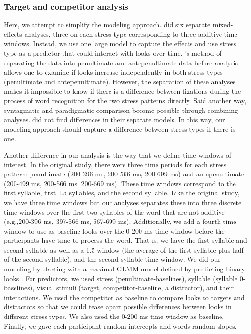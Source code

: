 \subsubsection{Target and competitor analysis}
Here, we attempt to simplify the modeling approach. \cite{Sulpizio_McQueen_2012} did six separate mixed-effects analyses, three on each stress type corresponding to three additive time windows. Instead, we use one large model to capture the effects and use stress type as a predictor that could interact with looks over time. \cite{Sulpizio_McQueen_2012}'s method of separating the data into penultimate and antepenultimate data before analysis allows one to examine if looks increase independently in both stress types (penultimate and antepenultimate). However, the separation of these analyses makes it impossible to know if there is a difference between fixations during the process of word recognition for the two stress patterns directly. Said another way, syntagmatic and paradigmatic comparison become possible through combining analyses. \cite{Sulpizio_McQueen_2012} did not find differences in their separate models. In this way, our modeling approach should capture a difference between stress types if there is one. 

Another difference in our analysis is the way that we define time windows of interest. In the original study, there were three time periods for each stress pattern: penultimate (200-396 ms, 200-566 ms, 200-699 ms) and antepenultimate (200-499 ms, 200-566 ms, 200-669 ms). These time windows correspond to the first syllable, first 1.5 syllables, and the second syllable. Like the original study, we have three time windows but our analyses separates these into three discrete time windows over the first two syllables of the word that are not additive (e.g.,200-396 ms, 397-566 ms, 567-699 ms). Additionally, we add a fourth time window to use as baseline looks over the 0-200 ms time window before the participants have time to process the word. That is, we have the first syllable and second syllable as well as a 1.5 window (the average of the first syllable plus half of the second syllable), and the second syllable time window. We did our modeling by starting with a maximal GLMM model defined by predicting binary looks \citep{Barr_2008}. For predictors, we used stress (penultimate-baselines), syllable (syllable 0-baselines), visual stimuli (target, competitor-baseline, a distractor), and their interactions. We used the competitor as baseline to compare looks to targets and distractors so that we could tease apart possible differences between looks in different stress types. We also used the 0-200 ms time window as baseline. Finally, we gave each participant random intercepts and words random slopes.

